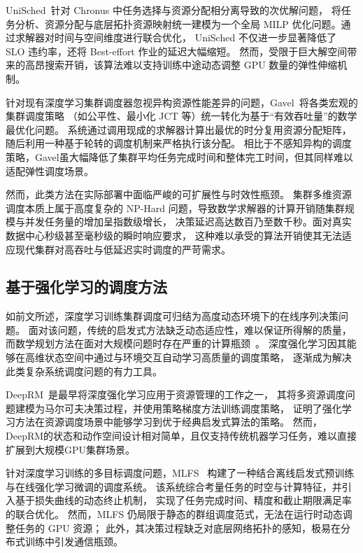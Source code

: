 UniSched~\cite{gao2024unisched}针对 Chronus 中任务选择与资源分配相分离导致的次优解问题，
将任务分析、资源分配与底层拓扑资源映射统一建模为一个全局 MILP 优化问题。通过求解器对时间与空间维度进行联合优化，
UniSched 不仅进一步显著降低了 SLO 违约率，还将 Best-effort 作业的延迟大幅缩短。
然而，受限于巨大解空间带来的高昂搜索开销，该算法难以支持训练中途动态调整 GPU 数量的弹性伸缩机制。

针对现有深度学习集群调度器忽视异构资源性能差异的问题，Gavel~\cite{narayanan2020heterogeneity}将各类宏观的集群调度策略
（如公平性、最小化 JCT 等）统一转化为基于“有效吞吐量”的数学最优化问题。
系统通过调用现成的求解器计算出最优的时分复用资源分配矩阵，随后利用一种基于轮转的调度机制来严格执行该分配。
相比于不感知异构的调度策略，Gavel虽大幅降低了集群平均任务完成时间和整体完工时间，但其同样难以适配弹性调度场景。

然而，此类方法在实际部署中面临严峻的可扩展性与时效性瓶颈。
集群多维资源调度本质上属于高度复杂的 NP-Hard 问题，导致数学求解器的计算开销随集群规模与并发任务量的增加呈指数级增长，
决策延迟高达数百乃至数千秒。面对真实数据中心秒级甚至毫秒级的瞬时响应要求，
这种难以承受的算法开销使其无法适应现代集群对高吞吐与低延迟实时调度的严苛需求。

\subsection{基于强化学习的调度方法}
如前文所述，深度学习训练集群调度可归结为高度动态环境下的在线序列决策问题。
面对该问题，传统的启发式方法缺乏动态适应性，难以保证所得解的质量，
而数学规划方法在面对大规模问题时存在严重的计算瓶颈~\cite{gao2021chronus,qiao2021pollux}。
深度强化学习因其能够在高维状态空间中通过与环境交互自动学习高质量的调度策略，
逐渐成为解决此类复杂系统调度问题的有力工具。

DeepRM~\cite{mao2016resource}是最早将深度强化学习应用于资源管理的工作之一，
其将多资源调度问题建模为马尔可夫决策过程，并使用策略梯度方法训练调度策略，
证明了强化学习方法在资源调度场景中能够学习到优于经典启发式算法的策略。
然而，DeepRM的状态和动作空间设计相对简单，且仅支持传统机器学习任务，难以直接扩展到大规模GPU集群场景。

针对深度学习训练的多目标调度问题，MLFS~\cite{wang2020job} 构建了一种结合离线启发式预训练与在线强化学习微调的调度系统。
该系统综合考量任务的时空与计算特征，并引入基于损失曲线的动态终止机制，
实现了任务完成时间、精度和截止期限满足率的联合优化。
然而，MLFS 仍局限于静态的群组调度范式，无法在运行时动态调整任务的 GPU 资源；
此外，其决策过程缺乏对底层网络拓扑的感知，极易在分布式训练中引发通信瓶颈。

